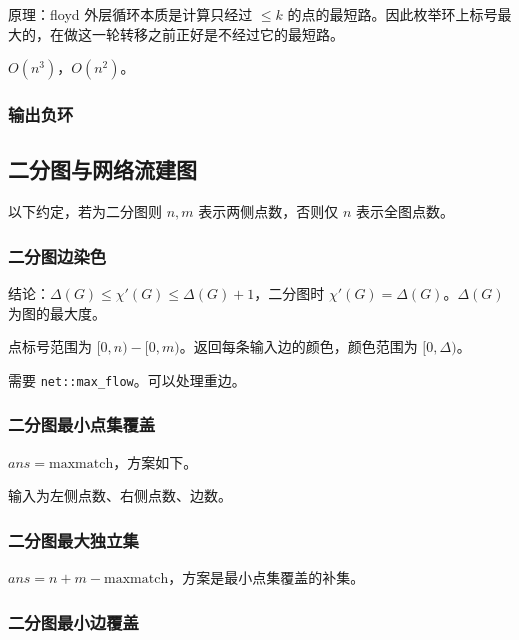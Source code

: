 \documentclass[12pt]{ctexart}
\begin{document}
原理：floyd 外层循环本质是计算只经过 $\le k$ 的点的最短路。因此枚举环上标号最大的，在做这一轮转移之前正好是不经过它的最短路。

$O(n^3)$，$O(n^2)$。



\subsubsection{输出负环}




\subsection{二分图与网络流建图}

以下约定，若为二分图则 $n,m$ 表示两侧点数，否则仅 $n$ 表示全图点数。

\subsubsection{二分图边染色}

结论：$\Delta(G)\le \chi'(G) \le \Delta(G)+1$，二分图时 $\chi'(G)=\Delta(G)$。$\Delta(G)$ 为图的最大度。

点标号范围为 $[0,n)-[0,m)$。返回每条输入边的颜色，颜色范围为 $[0,\Delta)$。

需要 \verb|net::max_flow|。可以处理重边。



\subsubsection{二分图最小点集覆盖}

$ans=\text{maxmatch}$，方案如下。

输入为左侧点数、右侧点数、边数。



\subsubsection{二分图最大独立集}

$ans=n+m-\text{maxmatch}$，方案是最小点集覆盖的补集。

\subsubsection{二分图最小边覆盖}
\end{document}
